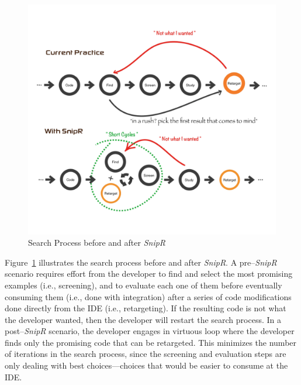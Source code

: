 \begin{figure}[!ht]
    \centering
    \includegraphics[width=\textwidth,height=0.8\textheight,keepaspectratio]{images/searchprocess}
    \caption{Search Process before and after \emph{SnipR}}
    \label{fig:retargeting}
\end{figure}

Figure~\ref{fig:retargeting} illustrates the search process before and after \emph{SnipR}. A pre--\emph{SnipR} scenario requires effort from the developer to find and select the most promising examples (i.e., screening), and to evaluate each one of them before eventually consuming them (i.e., done with integration) after a series of code modifications done directly from the IDE (i.e., retargeting). If the resulting code is not what the developer wanted, then the developer will restart the search process. In a post--\emph{SnipR} scenario, the developer engages in virtuous loop where the developer finds only the promising code that can be retargeted. This minimizes the number of iterations in the search process, since the screening and evaluation steps are only dealing with best choices---choices that would be easier to consume at the IDE.

